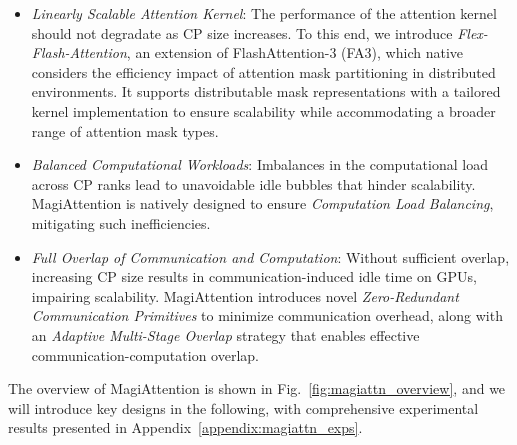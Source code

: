 \begin{itemize}
    \item \emph{Linearly Scalable Attention Kernel}: The performance of the attention kernel should not degradate as CP size increases. To this end, we introduce \emph{Flex-Flash-Attention}, an extension of FlashAttention-3 (FA3), which native considers the efficiency impact of attention mask partitioning in distributed environments. It supports distributable mask representations with a tailored kernel implementation to ensure scalability while accommodating a broader range of attention mask types.
    \item \emph{Balanced Computational Workloads}: Imbalances in the computational load across CP ranks lead to unavoidable idle bubbles that hinder scalability. MagiAttention is natively designed to ensure \emph{Computation Load Balancing}, mitigating such inefficiencies.
    \item \emph{Full Overlap of Communication and Computation}: Without sufficient overlap, increasing CP size results in communication-induced idle time on GPUs, impairing scalability. MagiAttention introduces novel \emph{Zero-Redundant Communication Primitives} to minimize communication overhead, along with an \emph{Adaptive Multi-Stage Overlap} strategy that enables effective communication-computation overlap.
\end{itemize}

The overview of MagiAttention is shown in Fig.~\ref{fig:magiattn_overview}, and we will introduce key designs in the following, with comprehensive experimental results presented in Appendix~\ref{appendix:magiattn_exps}.















